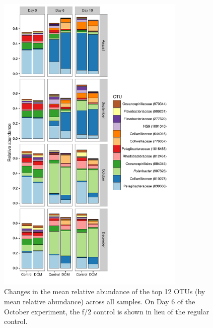 \begin{figure}[ht!] 
\centering 
\includegraphics[width=0.8\textwidth]{Chapter_4_DOM/Figures/Figure_4_OTU_barplot}
\caption[Changes in the mean relative abundance of the top 12 OTUs (by mean relative abundance) across all experiments.]{Changes in the mean relative abundance of the top 12 OTUs (by mean relative abundance) across all samples. On Day 6 of the October experiment, the f/2 control is shown in lieu of the regular control.} 
\label{fig:ch3:otu_barplot} 
\end{figure}


